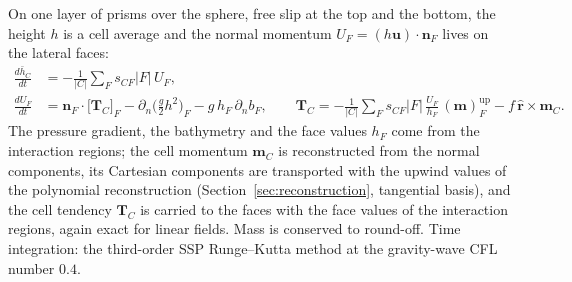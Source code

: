 \documentclass[preprint,12pt]{elsarticle}
\newcommand{\bn}{\mathbf{n}}
\newcommand{\bu}{\mathbf{u}}
\theoremstyle{definition}
\begin{document}
On one layer of prisms over the sphere, free slip at the top and the bottom, the height $h$ is a cell
average and the normal momentum $U_F=(h\bu)\cdot\bn_F$ lives on the lateral faces:
\begin{align}
\frac{d\bar h_C}{dt} &= -\frac{1}{|C|}\sum_F s_{CF}|F|\,U_F,\\
\frac{dU_F}{dt} &= \bn_F\cdot\big[\mathbf T_C\big]_F - \partial_n\big(\tfrac g2 h^2\big)_F - g\,h_F\,\partial_n b_F,
\qquad
\mathbf T_C = -\frac{1}{|C|}\sum_F s_{CF}|F|\,\frac{U_F}{h_F}\,(\mathbf m)_F^{\mathrm{up}} - f\,\hat{\mathbf r}\times\mathbf m_C .
\end{align}
The pressure gradient, the bathymetry and the face values $h_F$ come from the interaction regions;
the cell momentum $\mathbf m_C$ is reconstructed from the normal components, its Cartesian
components are transported with the upwind values of the polynomial reconstruction
(Section~\ref{sec:reconstruction}, tangential basis), and the cell tendency $\mathbf T_C$ is carried
to the faces with the face values of the interaction regions, again exact for linear fields. Mass is
conserved to round-off. Time integration: the third-order SSP Runge--Kutta method at the gravity-wave
CFL number $0.4$.
\end{document}
